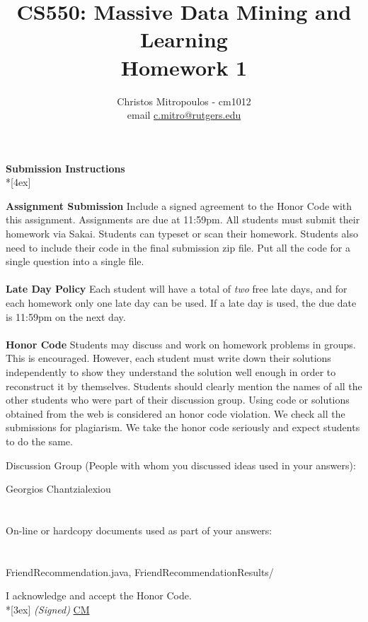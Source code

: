 \documentclass[11pt]{article}
\title{\LARGE{\bf \textsf{CS550: Massive Data Mining and Learning}}\\ {\bf \textsf{Homework 1}}}
\author{Christos Mitropoulos - cm1012 \\ email \href{mailto:c.mitro@rutgers.edu}{c.mitro@rutgers.edu}}
\date{}
\begin{document}
\begin{titlepage}
\maketitle
\end{titlepage}

\pagebreak[4]
\begin{center}
\LARGE{\bf \textsf{Submission Instructions}} \\*[4ex]
\end{center}

\textbf{Assignment Submission } Include a signed agreement to the Honor Code with this assignment. Assignments are due at 11:59pm. All students must submit their homework via Sakai. Students can typeset or scan their homework. Students also need to include their code in the final submission zip file. Put all the code for a single question into a single file. 
\\
\\
\textbf{Late Day Policy } Each student will have a total of {\em two} free late days, and for each homework only one late day can be used. If a late day is used, the due date is 11:59pm on the next day.
\\
\\
\textbf{Honor Code } Students may discuss and work on homework problems in groups. This is encouraged. However, each student must write down their solutions independently to show they understand the solution well enough in order to reconstruct it by themselves.  Students should clearly mention the names of all the other students who were part of their discussion group. Using code or solutions obtained from the web is considered an honor code violation. We check all the submissions for plagiarism. We take the honor code seriously and expect students to do the same. 

\vfill
\vfill

Discussion Group (People with whom you discussed ideas used in your answers):

 Georgios Chantzialexiou \\\\\\
On-line or hardcopy documents used as part of your answers: \\\\\\
\vfill
FriendRecommendation.java, FriendRecommendationResults/
\vfill

I acknowledge and accept the Honor Code.\\*[3ex]
\bigskip
\textit{(Signed)} \underline{CM} 
\end{document}
